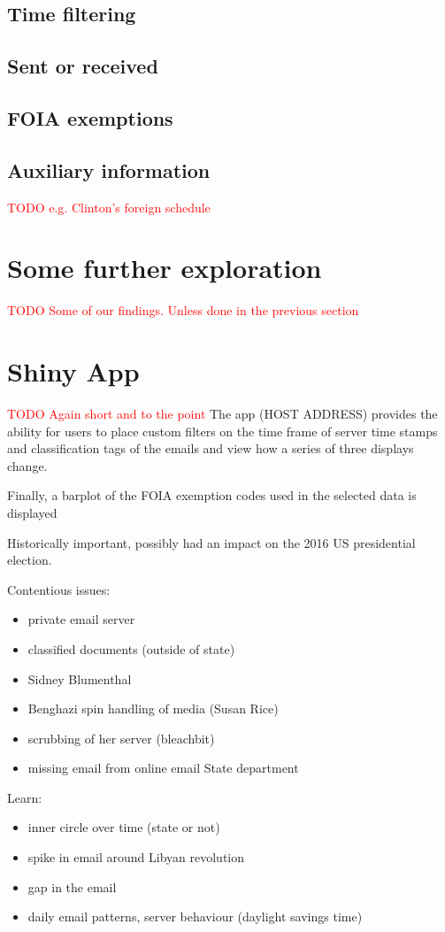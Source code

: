 \documentclass[journal]{vgtc}                %
\newcommand*{\TODO}[1]{\textcolor{red}{TODO #1}}
\begin{document}
\subsection{Time filtering}
\subsection{Sent or received}
\subsection{FOIA exemptions}
\subsection{Auxiliary information}
\TODO{e.g. Clinton's foreign schedule}
\section{Some further exploration}
\TODO{Some of our findings.  Unless done in the previous section}
\section{Shiny App}
\TODO{Again short and to the point}
The app (HOST ADDRESS) provides the ability for users to place custom filters on the time frame of server time stamps and classification tags of the emails and view how a series of three displays change. 

Finally, a barplot of the FOIA exemption codes used in the selected data is displayed

Historically important,  possibly had an impact on the 2016 US presidential election.

Contentious issues:
\begin{itemize}
\item private email server
\item classified documents (outside of state)
\item Sidney Blumenthal
\item Benghazi spin handling of media (Susan Rice)

\item scrubbing of her server (bleachbit)
\item missing email from online email State department
\end{itemize}


Learn:
\begin{itemize}
\item inner circle over time (state or not)
\item spike in email around Libyan revolution
\item gap in the email
\item daily email patterns, server behaviour (daylight savings time)
\end{itemize}
\end{document}
